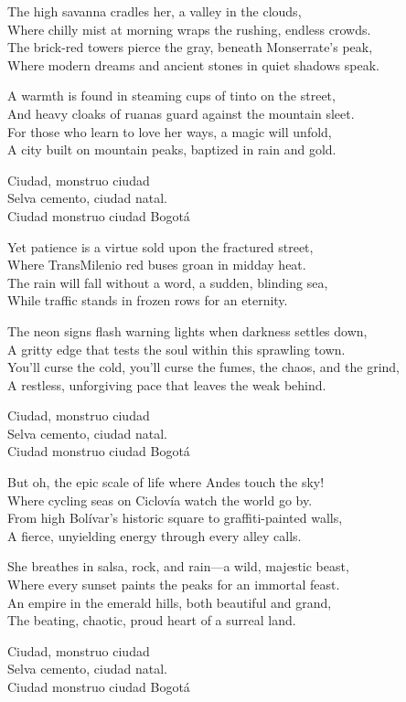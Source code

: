 \begin{lyrics}
The high savanna cradles her, a valley in the clouds,\\
Where chilly mist at morning wraps the rushing, endless crowds.\\
The brick-red towers pierce the gray, beneath Monserrate’s peak,\\
Where modern dreams and ancient stones in quiet shadows speak.

A warmth is found in steaming cups of tinto on the street,\\
And heavy cloaks of ruanas guard against the mountain sleet.\\
For those who learn to love her ways, a magic will unfold,\\
A city built on mountain peaks, baptized in rain and gold.

Ciudad, monstruo ciudad\\
Selva cemento, ciudad natal.\\ 
Ciudad monstruo ciudad Bogotá 

Yet patience is a virtue sold upon the fractured street,\\
Where TransMilenio red buses groan in midday heat.\\
The rain will fall without a word, a sudden, blinding sea,\\
While traffic stands in frozen rows for an eternity.

The neon signs flash warning lights when darkness settles down,\\
A gritty edge that tests the soul within this sprawling town.\\
You'll curse the cold, you'll curse the fumes, the chaos, and the grind,\\
A restless, unforgiving pace that leaves the weak behind.

Ciudad, monstruo ciudad\\
Selva cemento, ciudad natal.\\ 
Ciudad monstruo ciudad Bogotá

But oh, the epic scale of life where Andes touch the sky!\\
Where cycling seas on Ciclovía watch the world go by.\\
From high Bolívar’s historic square to graffiti-painted walls,\\
A fierce, unyielding energy through every alley calls.

She breathes in salsa, rock, and rain—a wild, majestic beast,\\
Where every sunset paints the peaks for an immortal feast.\\
An empire in the emerald hills, both beautiful and grand,\\
The beating, chaotic, proud heart of a surreal land.

Ciudad, monstruo ciudad\\
Selva cemento, ciudad natal.\\ 
Ciudad monstruo ciudad Bogotá
\end{lyrics}


